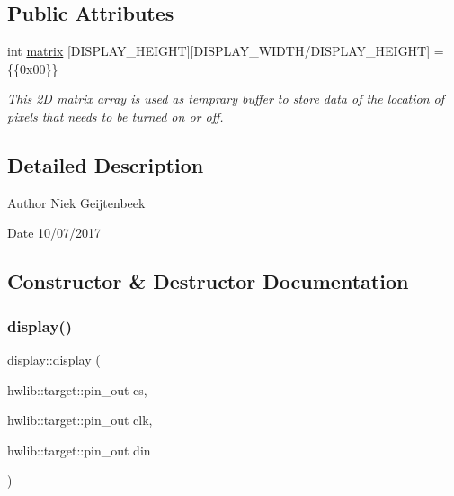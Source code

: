 \subsection*{Public Attributes}
\begin{DoxyCompactItemize}
\item 
int \hyperlink{classdisplay_a7577a542a26a85ebf47e012d8b45070b}{matrix} \mbox{[}D\+I\+S\+P\+L\+A\+Y\+\_\+\+H\+E\+I\+G\+HT\mbox{]}\mbox{[}D\+I\+S\+P\+L\+A\+Y\+\_\+\+W\+I\+D\+TH/D\+I\+S\+P\+L\+A\+Y\+\_\+\+H\+E\+I\+G\+HT\mbox{]} = \{\{0x00\}\}
\begin{DoxyCompactList}\small\item\em This 2D matrix array is used as temprary buffer to store data of the location of pixels that needs to be turned on or off. \end{DoxyCompactList}\end{DoxyCompactItemize}


\subsection{Detailed Description}
\begin{DoxyAuthor}{Author}
Niek Geijtenbeek 
\end{DoxyAuthor}
\begin{DoxyDate}{Date}
10/07/2017 
\end{DoxyDate}


\subsection{Constructor \& Destructor Documentation}
\mbox{\label{classdisplay_ac255c97163cd08cc4e6d7a4beeff2b76}} 
\subsubsection{\texorpdfstring{display()}{display()}}
{\footnotesize\ttfamily display\+::display (\begin{DoxyParamCaption}\item[{hwlib\+::target\+::pin\+\_\+out}]{cs,  }\item[{hwlib\+::target\+::pin\+\_\+out}]{clk,  }\item[{hwlib\+::target\+::pin\+\_\+out}]{din }\end{DoxyParamCaption})}



